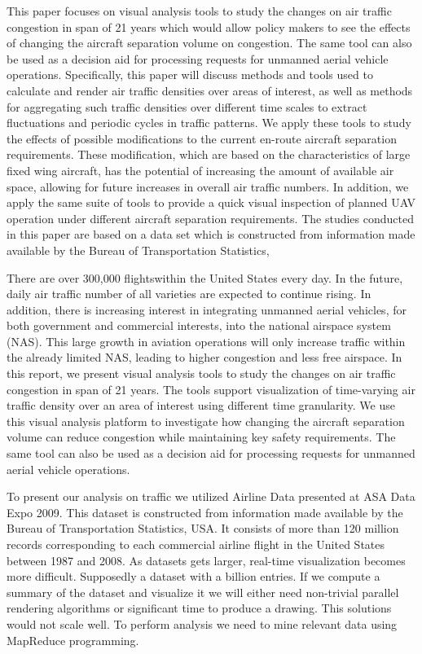 This paper focuses on visual analysis tools to study the changes on air traffic congestion in span of 21 years which would allow policy makers to see the effects of changing the aircraft separation volume on congestion. The same tool can also be used as a decision aid for processing requests for unmanned aerial vehicle operations. Specifically, this paper will discuss methods
and tools used to calculate and render air traffic densities over areas of interest, as well as methods for aggregating such traffic densities over different time scales to extract fluctuations and periodic cycles in traffic patterns. We apply these tools to study the effects of possible modifications to the current en-route aircraft separation requirements. These modification, which are based on the characteristics of large fixed wing aircraft, has the potential of increasing the amount of available air space, allowing for future increases in overall air traffic numbers. In addition, we apply the same suite of tools to provide a quick visual inspection of planned UAV operation under different aircraft separation requirements. The studies conducted in this paper are based on a data set which is constructed from information made available by the Bureau of Transportation Statistics, 

There are over 300,000 flightswithin the United States every day. In the future, daily air traffic number of all varieties are expected to continue rising. In addition, there is increasing interest in integrating unmanned aerial vehicles, for both government and commercial interests, into the national airspace system (NAS). This large growth in aviation operations will only increase traffic within the already limited NAS, leading to higher congestion and less free airspace. In this report, we present visual analysis tools
to study the changes on air traffic congestion in span of 21 years. The tools support visualization of time-varying
air traffic density over an area of interest using different time granularity. We use this visual analysis
platform to investigate how changing the aircraft separation volume can reduce congestion while maintaining key safety requirements. The same tool can also be used as a decision aid for processing requests for unmanned aerial vehicle operations.

To present our analysis on traffic we utilized Airline Data presented at ASA Data Expo 2009. This dataset is constructed from information made available by the Bureau of Transportation Statistics, USA. It consists of more than 120 million records corresponding to each commercial airline flight in the United States between 1987 and 2008. As datasets gets larger, real-time visualization becomes more difficult. Supposedly a dataset with a billion entries. If we compute a summary of the dataset and visualize it we will either need non-trivial parallel rendering algorithms or significant time to produce a drawing. This solutions would not scale well. To perform analysis we need to mine relevant data using MapReduce programming. 
 

